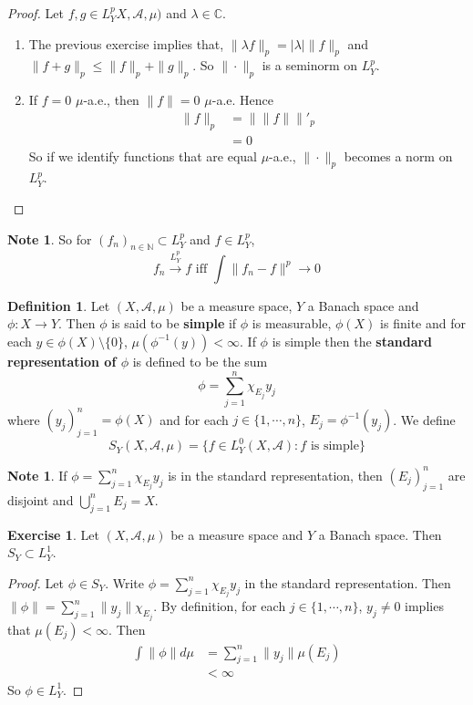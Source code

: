 \documentclass{book}
\theoremstyle{definition}
\newtheorem{defn}[definition]{Definition}
\newtheorem{note}[definition]{Note}
\newtheorem{ex}[definition]{Exercise}
\newcommand{\lam}{\lambda}
\newcommand{\C}{\mathbb{C}}
\newcommand{\N}{\mathbb{N}}
\newcommand{\MA}{\mathcal{A}}
\newcommand{\ld}[1]{\label{defn:#1}}
\DeclareMathOperator*{\0}{\mbf{0}}
\DeclareMathOperator*{\1}{\mbf{1}}
\newcommand{\conv}[1]{\xrightarrow{#1}}
\begin{document}
	\begin{proof} 
	Let $f, g \in L^p_YX, \MA, \mu)$ and $\lam \in \C$. 
	\begin{enumerate}
	\item The previous exercise implies that, $\|\lam f\|_p = |\lam|\|f\|_p$ and $\|f+g\|_p \leq \|f\|_p + \|g \|_p$. So $\|\cdot\|_p$ is a seminorm on $L_Y^p$.
	\item If $f = 0$ $\mu$-a.e., then $\|f\| = 0$  $\mu$-a.e. Hence
	\begin{align*}
	\|f\|_p 
	&= \|\|f\|\|'_p \\
	&= 0
\end{align*}
	So if we identify functions that are equal $\mu$-a.e., $\|\cdot\|_p$ becomes a norm on $L^p_Y$. 	  
	\end{enumerate}
	\end{proof}
	
	\begin{note}
	So for $(f_n)_{n \in \N} \subset L^p_Y$ and $f \in L^p_Y$, $$f_n \conv{L^p_Y} f \text{ iff } \int \|f_n - f\|^p \rightarrow 0$$ 
	\end{note}
	
	\begin{defn} \ld{00000} 
	Let $(X, \MA, \mu)$ be a measure space, $Y$ a Banach space and $\phi: X \rightarrow Y$. Then $\phi$ is said to be \textbf{simple} if $\phi$ is measurable, $\phi(X)$ is finite and for each $y \in \phi(X) \setminus \{0\}$, $\mu(\phi^{-1}(y)) < \infty$. If $\phi$ is simple then the \textbf{standard representation of $\phi$} is defined to be the sum $$\phi = \sum\limits_{j=1}^n \chi_{E_j}y_j$$ where $(y_j)_{j=1}^n = \phi(X)$ and for each $j \in \{1, \cdots, n\}$, $E_j = \phi^{-1}(y_j)$. We define $$S_Y(X, \MA, \mu) = \{f \in L_Y^0(X, \MA): f \text{ is simple}\}$$
	\end{defn}
	
	\begin{note}
	If $\phi = \sum\limits_{j=1}^n \chi_{E_j}y_j$ is in the standard representation, then $(E_j)_{j=1}^n$ are disjoint and $\bigcup\limits_{j=1}^n E_j = X$.
	\end{note}
	
	\begin{ex}
	Let $(X, \MA, \mu)$ be a measure space and $Y$ a Banach space. Then $S_Y \subset L^1_Y$. 
	\end{ex}
	
	\begin{proof}
	Let $\phi \in S_Y$. Write $\phi = \sum\limits_{j=1}^n \chi_{E_j}y_j$ in the standard representation. Then $\|\phi\| = \sum\limits_{j=1}^n \|y_j\|\chi_{E_j}$. By definition, for each $j \in \{1, \cdots, n\}$, $y_j \neq 0$ implies that $\mu(E_j) < \infty$. Then 
	\begin{align*}
	\int \|\phi\| d\mu 
	&= \sum\limits_{j=1}^n \|y_j\| \mu(E_j) \\
	&< \infty
	\end{align*}
	So $\phi \in L^1_Y$.
	\end{proof}
	
\end{document}
